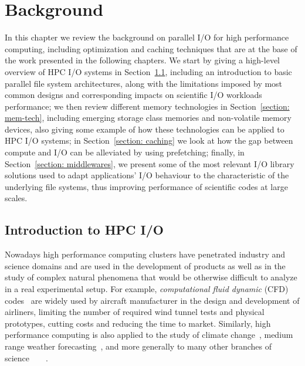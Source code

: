 \chapter{Background} \label{chapt: background}
In this chapter we review the background on parallel I/O for high performance computing, including optimization and caching techniques that are at the base of the work presented in the following chapters. We start by giving 
a high-level overview of HPC I/O systems in Section~\ref{section: hpc-io-sys}, including an introduction to basic parallel file system architectures, along with the limitations imposed by most common designs and corresponding 
impacts on scientific I/O workloads performance; we then review different memory technologies in Section~\ref{section: mem-tech}, including emerging storage class memories and non-volatile memory devices, also giving some 
example of how these technologies can be applied to HPC I/O systems; in Section~\ref{section: caching} we look at how the gap between compute and I/O can be alleviated by using prefetching; finally, in Section~\ref{section: 
middlewares}, we present some of the most relevant I/O library solutions used to adapt applications' I/O behaviour to the characteristic of the underlying file systems, thus improving performance of scientific codes at large scales.

\section{Introduction to HPC I/O}\label{section: hpc-io-sys}
Nowadays high performance computing clusters have penetrated industry and science domains and are used in the development of products as well as in the study of complex natural phenomena that would be otherwise 
difficult to analyze in a real experimental setup. For example, \textit{computational fluid dynamic} (CFD) codes~\cite{Isaac2013} are widely used by aircraft manufacturer in the design and development of airliners, limiting 
the number of required wind tunnel tests and physical prototypes, cutting costs and reducing the time to market. Similarly, high performance computing is also applied to the study of climate change~\cite{Vital2013}, medium range 
weather forecasting~\cite{Andrews2015}, and more generally to many other branches of science~\cite{Chatrchyan2011}~\cite{Markidis2010}~\cite{Deca2013}~\cite{Sobhaninejad2011}.

